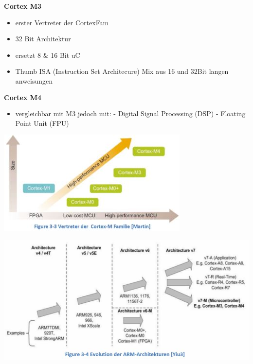 \begin{multicols}{2}
    \textbf{Cortex M3}     
    \begin{itemize}
        \item erster Vertreter der CortexFam
        \item 32 Bit Architektur
        \item ersetzt 8 \& 16 Bit uC
        \item Thumb ISA (Instruction Set Architecure)\newline
        Mix aus 16 und 32Bit langen anweisungen
    \end{itemize}   
    
    \textbf{Cortex M4} 
    \begin{itemize}
        \item vergleichbar mit M3 jedoch mit:
        \subitem - Digital Signal Processing (DSP)
        \subitem - Floating Point Unit (FPU)
        \newline
    \end{itemize}  
\end{multicols}
\begin{multicols}{2}
    \includegraphics[width=\linewidth]{images/cortexmfam}
    
    \includegraphics[width=\linewidth]{images/cortexmcomp}
\end{multicols}


